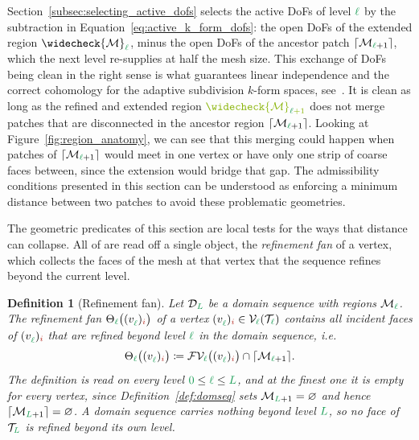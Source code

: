 \documentclass[a4paper, 12pt]{article}
\makeatletter
\newcommand{\robert}[1]{{\color{orange} #1}}
\newcommand{\guidance}[1]{{\color{lime!70!black} #1}}
\newcommand{\green}{\color{ForestGreen}}
\newcommand{\brickred}{\color{BrickRed}}
\newcommand{\T}{\mathcal{T}}
\newcommand{\V}{\mathcal{V}}
\newcommand{\F}{\mathcal{F}}
\newcommand{\vertex}[2]{\freeQ{v}{}{#1}{#2}}
\newcommand{\FVl}[1]{\F\V_{#1}}
\newcommand{\coarseIdxone}{{\brickred i}}
\renewcommand{\l}{{\green\ell}}
\renewcommand{\L}{{\green L}}
\newcommand{\lzero}{{\green 0}}
\newcommand{\freeQ}[4]{ ( {#1}^{#2}_{#3} )_{#4}}
\newcommand{\M}{\mathcal{M}}
\newtheorem{definition}[theorem]{Definition}
\theoremstyle{definition}
\theoremstyle{plain}
\numberwithin{equation}{section}
\newcommand{\extendedPatch}[1]{\widecheck{#1}}
\newcommand{\ancestorPatch}[1]{\lceil #1 \rceil}
\DeclareRobustCommand{\domseq}[1][]{\mathcal{D}\ifx\@empty#1\@empty\else_{#1}\fi}
\newcommand{\refFan}[1]{\Theta_{#1}}                        %
\makeatother
\begin{document}
Section~\ref{subsec:selecting_active_dofs} selects the active DoFs of level $\l$ by the subtraction in Equation~\eqref{eq:active_k_form_dofs}: the open DoFs of the extended region $\extendedPatch{\M}_\l$, minus the open DoFs of the ancestor patch $\ancestorPatch{\M_{\l+1}}$, which the next level re-supplies at half the mesh size. This exchange of DoFs being clean in the right sense is what guarantees linear independence and the correct cohomology for the adaptive subdivision $k$-form spaces, see~\cite{companion_paper}. It is clean as long as the refined and extended region $\guidance{\extendedPatch{\M}_{\l+1}}$ \guidance{does not merge patches that are disconnected in} the ancestor region $\ancestorPatch{\M_{\l+1}}$. Looking at Figure~\ref{fig:region_anatomy}, we can see that this merging could happen when patches of $\ancestorPatch{\M_{\l+1}}$ would meet in one vertex or have only one strip of coarse faces between, since the extension would bridge that gap. The admissibility conditions presented in this section can be understood as enforcing a minimum distance between two patches to avoid these problematic geometries.

The geometric predicates of this section are local tests for the ways that distance can collapse. All of are read off a single object, the \emph{refinement fan} of a vertex, which collects the faces of the mesh at that vertex that the sequence refines beyond the current level.

\begin{definition}[Refinement fan]
    \label{def:refinement_fan}
    Let $\domseq[\L]$ be a domain sequence with regions $\M_\l$. The \emph{refinement fan} $\refFan{\l} \big( \vertex{\l}{\coarseIdxone} \big)$ of a vertex $\vertex{\l}{\coarseIdxone} \in \V_\l(\T_\l)$ contains all incident faces of $\vertex{\l}{\coarseIdxone}$ that are refined beyond level $\l$ in the domain sequence, i.e.
    \begin{equation}
        \refFan{\l} \big( \vertex{\l}{\coarseIdxone} \big) \coloneq \FVl{\l} \big( \vertex{\l}{\coarseIdxone} \big) \cap \ancestorPatch{\M_{\l+1}}.
    \end{equation}
    \robert{The definition is read on every level $\lzero \leq \l \leq \L$, and at the finest one it is empty for every vertex, since Definition~\ref{def:domseq} sets $\M_{\L+1} = \varnothing$ and hence $\ancestorPatch{\M_{\L+1}} = \varnothing$. A domain sequence carries nothing beyond level $\L$, so no face of $\T_\L$ is refined beyond its own level.}
\end{definition}
\end{document}
